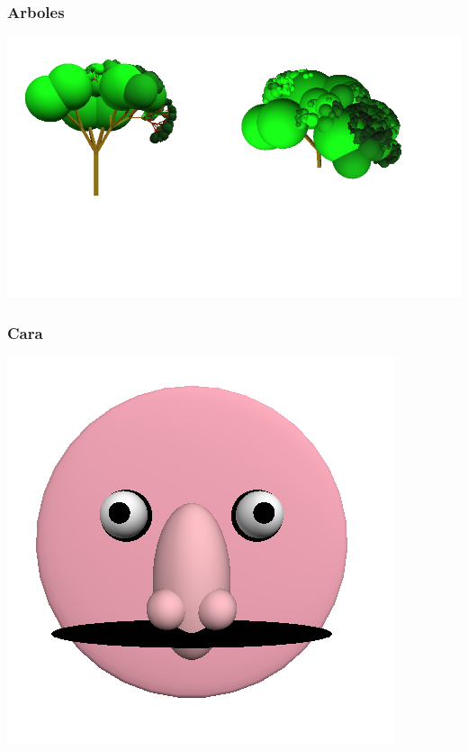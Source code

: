 \subsubsection{Arboles}



\centerline{\includegraphics[scale=0.40]{../imagenes/eg27.png}}


\subsubsection{Cara}



\centerline{\includegraphics[scale=0.40]{../imagenes/cara.png}}

